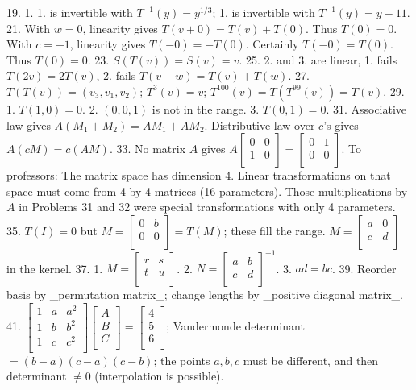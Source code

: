19. 1. 1. is invertible with \(T^{-1}(y)=y^{1/3}\); 1. is invertible with \(T^{-1}(y)=y-11\).
21. With \(w=0\), linearity gives \(T(v+0)=T(v)+T(0)\). Thus \(T(0)=0\). With \(c=-1\), linearity gives \(T(-0)=-T(0)\). Certainly \(T(-0)=T(0)\). Thus \(T(0)=0\).
23. \(S(T(v))=S(v)=v\).
25. 2. and 3. are linear, 1. fails \(T(2v)=2T(v)\), 2. fails \(T(v+w)=T(v)+T(w)\).
27. \(T(T(v))=(v_{3},v_{1},v_{2})\); \(T^{3}(v)=v\); \(T^{100}(v)=T(T^{99}(v))=T(v)\).
29. 1. \(T(1,0)=0\). 2. \((0,0,1)\) is not in the range. 3. \(T(0,1)=0\).
31. Associative law gives \(A(M_{1}+M_{2})=AM_{1}+AM_{2}\). Distributive law over \(c\)'s gives \(A(cM)=c(AM)\).
33. No matrix \(A\) gives \(A\begin{bmatrix}0&0\\ 1&0\\ \end{bmatrix}=\begin{bmatrix}0&1\\ 0&0\\ \end{bmatrix}\). To professors: The matrix space has dimension 4. Linear transformations on that space must come from 4 by 4 matrices (16 parameters). Those multiplications by \(A\) in Problems 31 and 32 were special transformations with only 4 parameters.
35. \(T(I)=0\) but \(M=\begin{bmatrix}0&b\\ 0&0\\ \end{bmatrix}=T(M)\); these fill the range. \(M=\begin{bmatrix}a&0\\ c&d\\ \end{bmatrix}\) in the kernel.
37. 1. \(M=\begin{bmatrix}r&s\\ t&u\\ \end{bmatrix}\). 2. \(N=\begin{bmatrix}a&b\\ c&d\\ \end{bmatrix}^{-1}\). 3. \(ad=bc\).
39. Reorder basis by _permutation matrix_; change lengths by _positive diagonal matrix_.
41. \(\begin{bmatrix}1&a&a^{2}\\ 1&b&b^{2}\\ 1&c&c^{2}\\ \end{bmatrix}\begin{bmatrix}A\\ B\\ C\\ \end{bmatrix}=\begin{bmatrix}4\\ 5\\ 6\\ \end{bmatrix}\); Vandermonde determinant \(=(b-a)(c-a)(c-b)\); the points \(a,b,c\) must be different, and then determinant \(\neq 0\) (interpolation is possible).

 